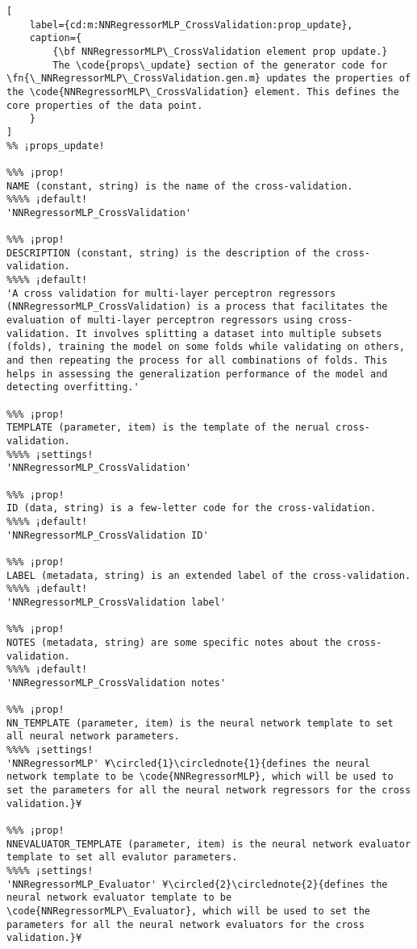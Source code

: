 \documentclass{tufte-handout}
\begin{document}
\begin{lstlisting}[
	label={cd:m:NNRegressorMLP_CrossValidation:prop_update},
	caption={
		{\bf NNRegressorMLP\_CrossValidation element prop update.}
		The \code{props\_update} section of the generator code for \fn{\_NNRegressorMLP\_CrossValidation.gen.m} updates the properties of the \code{NNRegressorMLP\_CrossValidation} element. This defines the core properties of the data point.
	}
]
%% ¡props_update!

%%% ¡prop!
NAME (constant, string) is the name of the cross-validation.
%%%% ¡default!
'NNRegressorMLP_CrossValidation'

%%% ¡prop!
DESCRIPTION (constant, string) is the description of the cross-validation.
%%%% ¡default!
'A cross validation for multi-layer perceptron regressors (NNRegressorMLP_CrossValidation) is a process that facilitates the evaluation of multi-layer perceptron regressors using cross-validation. It involves splitting a dataset into multiple subsets (folds), training the model on some folds while validating on others, and then repeating the process for all combinations of folds. This helps in assessing the generalization performance of the model and detecting overfitting.'

%%% ¡prop!
TEMPLATE (parameter, item) is the template of the nerual cross-validation.
%%%% ¡settings!
'NNRegressorMLP_CrossValidation'

%%% ¡prop!
ID (data, string) is a few-letter code for the cross-validation.
%%%% ¡default!
'NNRegressorMLP_CrossValidation ID'

%%% ¡prop!
LABEL (metadata, string) is an extended label of the cross-validation.
%%%% ¡default!
'NNRegressorMLP_CrossValidation label'

%%% ¡prop!
NOTES (metadata, string) are some specific notes about the cross-validation.
%%%% ¡default!
'NNRegressorMLP_CrossValidation notes'

%%% ¡prop!
NN_TEMPLATE (parameter, item) is the neural network template to set all neural network parameters.
%%%% ¡settings!
'NNRegressorMLP' ¥\circled{1}\circlednote{1}{defines the neural network template to be \code{NNRegressorMLP}, which will be used to set the parameters for all the neural network regressors for the cross validation.}¥

%%% ¡prop!
NNEVALUATOR_TEMPLATE (parameter, item) is the neural network evaluator template to set all evalutor parameters.
%%%% ¡settings!
'NNRegressorMLP_Evaluator' ¥\circled{2}\circlednote{2}{defines the neural network evaluator template to be \code{NNRegressorMLP\_Evaluator}, which will be used to set the parameters for all the neural network evaluators for the cross validation.}¥


\end{lstlisting}
\end{document}
